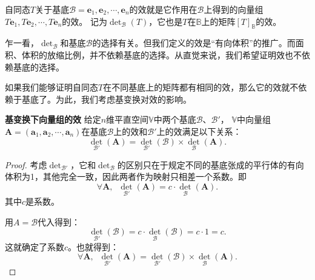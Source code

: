 \documentclass[12pt,UTF8,fontset=none]{ctexbook}
\begin{document}
\begin{df}\label{df:10_4}
自同态$T$关于基底$\mathcal{B} = \mathbf{e}_{1}, \mathbf{e}_{2}, \cdots, \mathbf{e}_{n}$的效就是它作用在$\mathcal{B}$上得到的向量组$T\mathbf{e}_1, T\mathbf{e}_2, \cdots , T\mathbf{e}_n$的效。
记为$\det_\mathcal{B}(T)$，它也是$T$在$\mathbb{B}$上的矩阵$[T]_{\mathbb{B}}$的效。
\end{df}

乍一看，$\det_\mathcal{B}$和基底$\mathcal{B}$的选择有关。但我们定义的效是“有向体积”的推广。而面积、体积的放缩比例，并不依赖基底的选择。从直觉来说，我们希望证明效也不依赖基底的选择。

如果我们能够证明自同态$T$在不同基底上的矩阵都有相同的效，那么它的效就不依赖于基底了。为此，我们考虑基变换对效的影响。
\begin{pp}\textbf{基变换下向量组的效 }\label{pp:10_7}
    给定$n$维平直空间$\mathbb{V}$中两个基底$\mathcal{B}$、$\mathcal{B}'$，
    $\mathbb{V}$中向量组$\mathbf{A} = (\mathbf{a}_1, \mathbf{a}_2, \cdots , \mathbf{a}_n)$在基底$\mathcal{B}$上的效和$\mathcal{B}'$上的效满足以下关系：
    $$ \det_{\mathcal{B}'}(\mathbf{A}) = \det_{\mathcal{B}'}(\mathcal{B}) \times \det_\mathcal{B} (\mathbf{A}). $$
\end{pp}
\begin{proof} %
    考虑$\det_{\mathcal{B}'}$，它和$\det_{\mathcal{B}}$的区别只在于规定不同的基底张成的平行体的有向体积为1，其他完全一致，因此两者作为映射只相差一个系数。即
    $$\forall \mathbf{A},\;\; \det_{\mathcal{B}'}(\mathbf{A}) = c\cdot \det_\mathcal{B} (\mathbf{A}). $$
    其中$c$是系数。

    用$A=\mathcal{B}$代入得到：
    $$ \det_{\mathcal{B}'}(\mathcal{B}) = c \cdot \det_\mathcal{B} (\mathcal{B}) = c\cdot 1 = c. $$
    这就确定了系数$c$。也就得到：
    $$\forall \mathbf{A},\;\;  \det_{\mathcal{B}'}(\mathbf{A}) = \det_{\mathcal{B}'}(\mathcal{B}) \times \det_\mathcal{B} (\mathbf{A}). $$
\end{proof}
\end{document}
